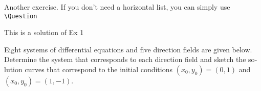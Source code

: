 \begin{otherlanguage}{english}
    \begin{Exercise}\label{EX12}
        Another exercise. 
        \Question If you don't need a horizontal list, you can simply use \verb|\Question|
    \end{Exercise}
    \begin{multicols}{2}
        \begin{Answer}[ref={EX12}]
            \Question This is a solution of Ex 1
        \end{Answer}
    \end{multicols}



    \begin{Exercise}\label{EX21}
        \vspace{-\baselineskip}%
        \Question Eight systems of differential equations and five direction fields are given below.  Determine the system that corresponds to each direction field and sketch the solution curves that correspond to the initial conditions $(x_0, y_0) = (0,1)$ and $(x_0, y_0) = (1,-1)$.
\end{Exercise}
\end{otherlanguage}
